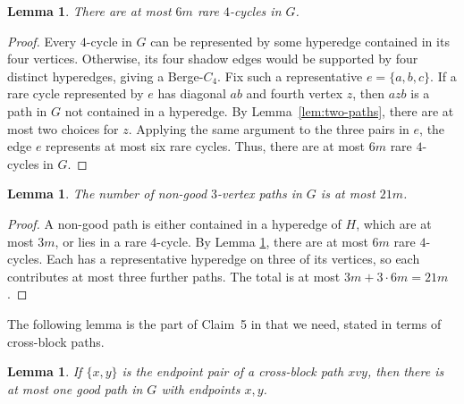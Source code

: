 \documentclass[11pt]{article}
\newtheorem{lemma}[theorem]{Lemma}
\begin{document}
\begin{lemma}\label{lem:rare}
There are at most $6m$ rare $4$-cycles in $G$.
\end{lemma}

\begin{proof}
Every $4$-cycle in $G$ can be represented by some hyperedge contained in its four vertices.
Otherwise, its four shadow edges would be supported by four distinct
hyperedges, giving a Berge-$C_4$.  Fix such a representative
$e=\{a,b,c\}$.  If a rare cycle represented by $e$ has diagonal $ab$ and fourth
vertex $z$, then $azb$ is a path in $G$ not contained in a hyperedge.  By
Lemma~\ref{lem:two-paths}, there are at most two choices for $z$.  Applying the
same argument to the three pairs in $e$, the edge $e$ represents at most six
rare cycles. Thus, there are at most $6m$ rare $4$-cycles in $G$.
\end{proof}

\begin{lemma}\label{lem:nongood}
The number of non-good $3$-vertex paths in $G$ is at most $21m$.
\end{lemma}

\begin{proof}
A non-good path is either contained in a hyperedge of $H$, which are at most $3m$, or lies in a rare $4$-cycle. By Lemma \ref{lem:rare}, there are at most $6m$ rare $4$-cycles. Each has a representative hyperedge on three of its vertices, so each contributes at most three further paths. The total is at most $3m+3\cdot6m=21m$.
\end{proof}

The following lemma is the part of Claim~5 in \cite{ergemlidze20203} that we need, stated in terms of cross-block paths.

\begin{lemma}\label{lem:cross-one}
If $\{x,y\}$ is the endpoint pair of a cross-block path $xvy$, then there is at most one good path in $G$ with endpoints $x,y$.
\end{lemma}
\end{document}
